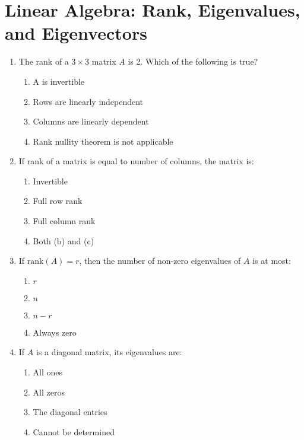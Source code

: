 \section{Linear Algebra: Rank, Eigenvalues, and Eigenvectors}


\begin{enumerate}

\item The rank of a \(3 \times 3\) matrix \(A\) is 2. Which of the following is true?

\begin{enumerate}[label=(\alph*)]
\item A is invertible 
\item Rows are linearly independent 
\item Columns are linearly dependent 
\item Rank nullity theorem is not applicable
\end{enumerate}

\item If rank of a matrix is equal to number of columns, the matrix is:

\begin{enumerate}[label=(\alph*)]
\item Invertible 
\item Full row rank 
\item Full column rank 
\item Both (b) and (c)
\end{enumerate}

\item If \( \text{rank}(A) = r \), then the number of non-zero eigenvalues of \( A \) is at most:

\begin{enumerate}[label=(\alph*)]
\item \( r \) \quad \item \( n \) \quad \item \( n - r \) \quad \item Always zero
\end{enumerate}

\item If \( A \) is a diagonal matrix, its eigenvalues are:

\begin{enumerate}[label=(\alph*)]
\item All ones \quad \item All zeros \quad \item The diagonal entries \quad \item Cannot be determined
\end{enumerate}


\end{enumerate}
